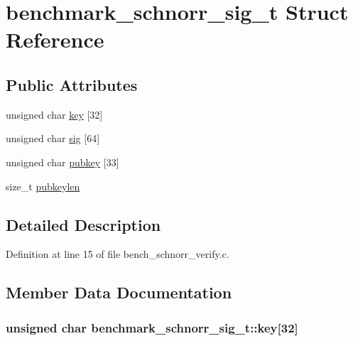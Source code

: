 \hypertarget{structbenchmark__schnorr__sig__t}{}\section{benchmark\+\_\+schnorr\+\_\+sig\+\_\+t Struct Reference}
\label{structbenchmark__schnorr__sig__t}
\subsection*{Public Attributes}
\begin{DoxyCompactItemize}
\item 
unsigned char \hyperlink{structbenchmark__schnorr__sig__t_a5ebb1700a47ec8863a115650a40a2d99}{key} \mbox{[}32\mbox{]}
\item 
unsigned char \hyperlink{structbenchmark__schnorr__sig__t_a0d16a9e3a795fe2ff06e8ff1af30ab43}{sig} \mbox{[}64\mbox{]}
\item 
unsigned char \hyperlink{structbenchmark__schnorr__sig__t_ae39c82dca3bb449e702b126a60b34583}{pubkey} \mbox{[}33\mbox{]}
\item 
size\+\_\+t \hyperlink{structbenchmark__schnorr__sig__t_a14587cc26e44b3bc38c109f970edc6c2}{pubkeylen}
\end{DoxyCompactItemize}


\subsection{Detailed Description}


Definition at line 15 of file bench\+\_\+schnorr\+\_\+verify.\+c.



\subsection{Member Data Documentation}
\hypertarget{structbenchmark__schnorr__sig__t_a5ebb1700a47ec8863a115650a40a2d99}{}
\subsubsection[{key}]{\setlength{\rightskip}{0pt plus 5cm}unsigned char benchmark\+\_\+schnorr\+\_\+sig\+\_\+t\+::key\mbox{[}32\mbox{]}}\label{structbenchmark__schnorr__sig__t_a5ebb1700a47ec8863a115650a40a2d99}


